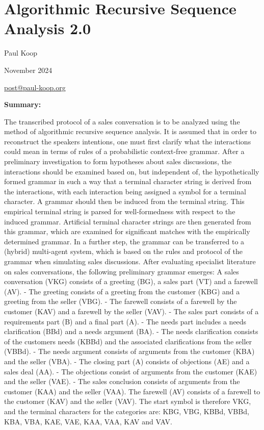 \documentclass[
]{article}
\author{}
\date{}
\begin{document}
\section{\texorpdfstring{\textbf{Algorithmic Recursive Sequence Analysis
2.0}}{Algorithmic Recursive Sequence Analysis 2.0}}\label{algorithmic-recursive-sequence-analysis-2.0}

Paul Koop

November 2024

\href{mailto:post@paul-koop.org}{\ul{post@paul-koop.org}}

\textbf{Summary:}

The transcribed protocol of a sales conversation is to be analyzed using
the method of algorithmic recursive sequence analysis. It is assumed
that in order to reconstruct the speakers\textquotesingle{} intentions,
one must first clarify what the interactions could mean in terms of
rules of a probabilistic context-free grammar. After a preliminary
investigation to form hypotheses about sales discussions, the
interactions should be examined based on, but independent of, the
hypothetically formed grammar in such a way that a terminal character
string is derived from the interactions, with each interaction being
assigned a symbol for a terminal character. A grammar should then be
induced from the terminal string. This empirical terminal string is
parsed for well-formedness with respect to the induced grammar.
Artificial terminal character strings are then generated from this
grammar, which are examined for significant matches with the empirically
determined grammar. In a further step, the grammar can be transferred to
a (hybrid) multi-agent system, which is based on the rules and protocol
of the grammar when simulating sales discussions. After evaluating
specialist literature on sales conversations, the following preliminary
grammar emerges: A sales conversation (VKG) consists of a greeting (BG),
a sales part (VT) and a farewell (AV). - The greeting consists of a
greeting from the customer (KBG) and a greeting from the seller (VBG). -
The farewell consists of a farewell by the customer (KAV) and a farewell
by the seller (VAV). - The sales part consists of a requirements part
(B) and a final part (A). - The needs part includes a needs
clarification (BBd) and a needs argument (BA). - The needs clarification
consists of the customer\textquotesingle s needs (KBBd) and the
associated clarifications from the seller (VBBd). - The needs argument
consists of arguments from the customer (KBA) and the seller (VBA). -
The closing part (A) consists of objections (AE) and a sales deal (AA).
- The objections consist of arguments from the customer (KAE) and the
seller (VAE). - The sales conclusion consists of arguments from the
customer (KAA) and the seller (VAA). The farewell (AV) consists of a
farewell to the customer (KAV) and the seller (VAV). The start symbol is
therefore VKG, and the terminal characters for the categories are: KBG,
VBG, KBBd, VBBd, KBA, VBA, KAE, VAE, KAA, VAA, KAV and VAV.
\end{document}
